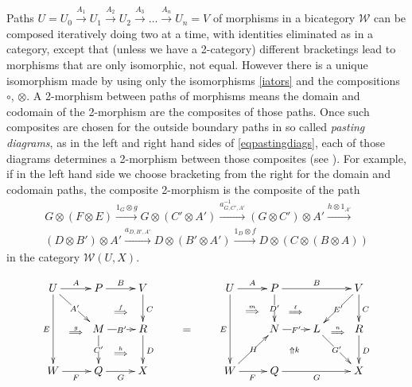 \documentclass[a4paper,12pt]{article}
\theoremstyle{step}
\newcommand{\xra}{\xrightarrow}
\def\CW{{\mathscr W}}
\def\ot{{\otimes}}
\begin{document}
Paths $U= U_0\xra{A_1} U_1 \xra{A_2} U_2\xra{A_3} \dots \xra{A_n} U_n= V$ of morphisms in a bicategory $\CW$ can be composed iteratively doing two at a time, with identities eliminated as in a category, except that (unless we have a 2-category) different bracketings lead to morphisms that are only isomorphic, not equal. However there is a unique
isomorphism made by using only the isomorphisms \eqref{iators} and the compositions $\circ$, $\otimes$. A 2-morphism between paths of morphisms means the domain and codomain of the 2-morphism are the composites of those paths. Once such composites are chosen for the outside boundary paths in so called
{\em pasting diagrams}, as in the left and right hand sides of \eqref{eqpastingdiags}, each of those diagrams determines a 2-morphism between those composites (see \cite{Ben, 7}). For example, if in
the left hand side we choose bracketing from the right for the domain and codomain paths, the composite 2-morphism is the composite of the path
\begin{eqnarray*}
G\otimes (F\otimes E)\xra{1_G\otimes g}G\ot (C'\ot A') \xra{a^{-1}_{G, C', A'}}(G\ot C')\ot A' \xra{h\ot 1_{A'}} \\
(D\ot B')\ot A' \xra{a_{D,B',A'}} D\ot (B'\ot A') \xra{1_D\ot f} D\ot(C\ot (B\ot A))
\end{eqnarray*}
in the category $\CW(U,X)$.

\begin{eqnarray}\label{eqpastingdiags}
\begin{aligned}
\xymatrix{\ar @{} [rdd] | {\stackrel{g} \Longrightarrow}
U \ar[r]^-{A} \ar[rd]|-{A'} \ar[dd]_-{E} &  \ar @{} [rd] | {\stackrel{f} \Longrightarrow} P \ar[r]^-{B} &  V \ar[d]^{C} \\
& M \ar[r]|-{B'} \ar[d]|-{C'} & R \ar[d]^{D} \\
W \ar[r]_{F} & Q \ar[r]_{G} & X  \ar @{} [lu] | {\stackrel{h} \Longrightarrow}
}
\end{aligned}
\qquad
=
\qquad
\begin{aligned}
\xymatrix{\ar @{} [rd] |  {\stackrel{m} \Longrightarrow}
U \ar[r]^-{A}  \ar[dd]_-{E} &  P\ar @{} [rd] | {\stackrel{\ell} \Longrightarrow}  \ar[d]|-{D'} \ar[rr]^-{B} & &  V  \ar[ld]|-{E'} \ar[d]^{C} \\
& N \ar[r]|-{F'}  & L \ar[dr]|-{G'}  & R \ar[d]^{D} \\
W \ar[ru]|-{H} \ar[r]_{F} & Q \ar[rr]_{G} & & X \ar @{} [lllu] | {\Uparrow k} \ar @{} [luu] | {\stackrel{n} \Longrightarrow}   
}
\end{aligned}
\end{eqnarray}
 
\end{document}
